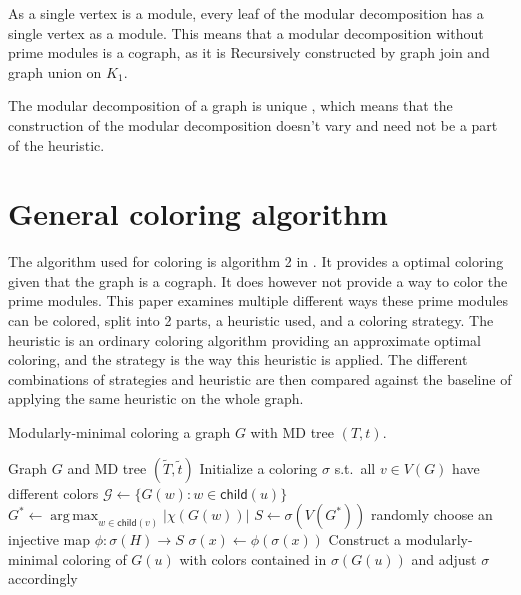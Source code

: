 \documentclass{amsart}
\newcommand{\child}{\mathsf{child}}
\DeclareMathOperator*{\argmax}{arg\,max}
\newcommand{\T}{\widetilde{T}}
\renewcommand{\t}{\widetilde{t}}
\begin{document}
As a single vertex is a module, every leaf of the modular decomposition has
a single vertex as a module. This means that a modular decomposition without
prime modules is a cograph, as it is Recursively constructed by graph join and
graph union on $K_1$.

The modular decomposition of a graph is unique \cite{HCL}, which means that the
construction of the modular decomposition doesn't vary and need not be a part of
the heuristic.


\section{General coloring algorithm}

The algorithm used for coloring is algorithm 2 in \cite{HCL}. It provides a
optimal coloring given that the graph is a cograph. It does however not
provide a way to color the prime modules. This paper examines multiple different
ways these prime modules can be colored, split into 2 parts, a heuristic used,
and a coloring strategy. The heuristic is an ordinary coloring algorithm
providing an approximate optimal coloring, and the strategy is the way this
heuristic is applied. The different combinations of strategies and heuristic are
then compared against the baseline of applying the same heuristic on the whole
graph.

\begin{algorithm}[H]
  \caption{Modularly-minimal coloring a graph $G$ with MD tree $(T,t)$.}
  \label{alg:generic}
  \begin{algorithmic}[1]
    \REQUIRE Graph $G$ and MD tree $(\T,\t)$
    \STATE Initialize a coloring $\sigma$ s.t.\ all $v \in V(G)$
           have different colors
          \STATE $\mathcal{G} \leftarrow \{G(w)\colon w\in\child(u)\}$ 
          \STATE $G^* \leftarrow \argmax_{w\in\child(v)} |\chi(G(w))|$
          \STATE $S \leftarrow \sigma(V(G^*))$ 
             \STATE randomly choose an injective map $\phi:\sigma(H)\to S$
                \STATE $\sigma(x)\leftarrow \phi(\sigma(x))$  
             \ENDFOR
          \ENDFOR
          \STATE Construct a modularly-minimal coloring of $G(u)$
              with colors contained in $\sigma(G(u))$
              and adjust $\sigma$ accordingly 
       \ENDIF
    \ENDFOR
  \end{algorithmic}
\end{algorithm}
\end{document}
